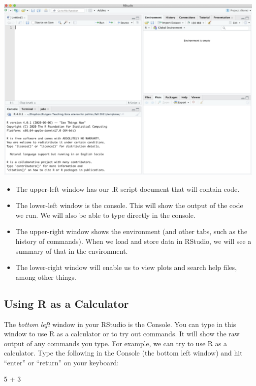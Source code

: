\documentclass[
  letterpaper,
  DIV=11,
  numbers=noendperiod]{scrreprt}
\newenvironment{Shaded}{\begin{snugshade}}{\end{snugshade}}
\newcommand{\DecValTok}[1]{\textcolor[rgb]{0.68,0.00,0.00}{#1}}
\newcommand{\SpecialCharTok}[1]{\textcolor[rgb]{0.37,0.37,0.37}{#1}}
\providecommand{\tightlist}{%
  \setlength{\itemsep}{0pt}\setlength{\parskip}{0pt}}\usepackage{longtable,booktabs,array}
\begin{document}
\includegraphics{images/rconsole2.png}

\begin{itemize}
\tightlist
\item
  The upper-left window has our .R script document that will contain
  code.
\item
  The lower-left window is the console. This will show the output of the
  code we run. We will also be able to type directly in the console.
\item
  The upper-right window shows the environment (and other tabs, such as
  the history of commands). When we load and store data in RStudio, we
  will see a summary of that in the environment.
\item
  The lower-right window will enable us to view plots and search help
  files, among other things.
\end{itemize}

\hypertarget{using-r-as-a-calculator}{%
\subsection{Using R as a Calculator}\label{using-r-as-a-calculator}}

The \emph{bottom left} window in your RStudio is the Console. You can
type in this window to use R as a calculator or to try out commands. It
will show the raw output of any commands you type. For example, we can
try to use R as a calculator. Type the following in the Console (the
bottom left window) and hit ``enter'' or ``return'' on your keyboard:

\begin{Shaded}
\begin{Highlighting}[]
\DecValTok{5} \SpecialCharTok{+} \DecValTok{3}
\end{Highlighting}
\end{Shaded}
\end{document}
